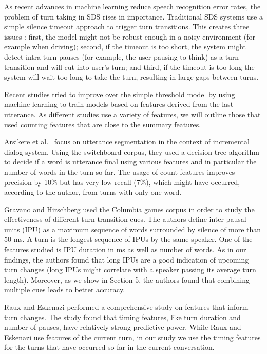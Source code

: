 
As recent advances in machine learning \cite{hinton2012deep} reduce speech recognition error rates, the problem of
turn taking in SDS rises in importance. Traditional SDS systems use a simple silence timeout approach to
trigger turn transitions. This creates three issues \cite{arsikere2015enhanced}: first, the model might not be robust enough
in a noisy environment (for example when driving); second, if the timeout is too short, the system might
detect intra turn pauses (for example, the user pausing to think) as a turn transition and will cut into user's turn;
and third, if the timeout is too long the system will wait too long to take the turn, resulting in large gaps between turns.

Recent studies tried to improve over the simple threshold model by using machine learning to train models based on features derived from the last utterance. As different studies use a variety of features, we will outline those that used counting features that are close to the summary features.

Arsikere et al.~\cite{atterer2008towards} focus on utterance segmentation in the context of incremental dialog system.
Using the switchboard corpus, they used a decision tree algorithm to decide if a word is utterance final using various features and in particular the number of words in the turn so far. The usage of count features improves precision by 10\% but has very low recall (7\%), which might have occurred, according to the author, from turns with only one word.

Gravano and Hirschberg \cite{gravano2011turn} used the Columbia games corpus in order to study the effectiveness of
different turn transition cues. The authors define inter pausal units (IPU) as a maximum sequence of words surrounded
by silence of more than 50 ms. A turn is the longest sequence of IPUs by the same speaker.
One of the features studied is IPU duration in ms as well as number of words. As in our findings,
the authors found that long IPUs are a good indication of upcoming turn changes (long IPUs might correlate with a speaker passing
its average turn length). Moreover, as we show in Section 5, the authors found that combining multiple cues leads to better accuracy.

Raux and Eskenazi \cite{raux2012optimizing} performed a comprehensive study on features that inform turn changes. The study
found that timing features, like turn duration and number of pauses, have relatively strong predictive power. While Raux and Eskenazi use features of the current turn, in our study we use the timing features for the turns that have occurred so far in the current conversation.

